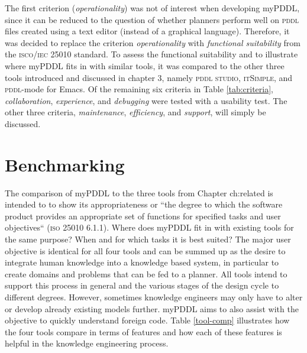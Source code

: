 \documentclass[a4paper,12pt]{report}
\newcommand{\mypddl}{\smallerft[0.8]{myPDDL}\xspace}
\newcommand{\pddlstudio}{\textsc{pddl studio}\xspace}
\newcommand{\itsimple}{\textsc{itSimple}\xspace}
\newcommand{\pddlmode}{\textsc{pddl}-mode\xspace}
\newcommand{\pddl}{\textsc{pddl}\xspace}
\newcommand\smallerft[2][0.85]{{\scalefont{#1}#2}}
\begin{document}
The first criterion (\emph{operationality}) was not of interest when
developing \mypddl, since it can be reduced to the question of whether
planners perform well on \pddl files created using a text editor
(instead of a graphical language). Therefore, it was decided to
replace the criterion \emph{operationality} with \emph{functional suitability}
from the \textsc{isco/iec} 25010 standard. To assess the functional
suitability and to illustrate where \mypddl fits in with similar
tools, it was compared to the other three tools introduced and
discussed in chapter 3, namely \pddlstudio, \itsimple, and \pddlmode
for Emacs. Of the remaining six criteria in Table \ref{tab:criteria},
\emph{collaboration}, \emph{experience}, and \emph{debugging} were tested with a
usability test. The other three criteria, \emph{maintenance}, \emph{efficiency},
and \emph{support}, will simply be discussed.


\section{Benchmarking}
\label{sec-5-1}

The comparison of \mypddl to the three tools from Chapter ch:related
is intended to to show its appropriateness or “the degree to which the
software product provides an appropriate set of functions for
specified tasks and user objectives“ (\textsc{iso} 25010 6.1.1). Where
does \mypddl fit in with existing tools for the same purpose? When and
for which tasks it is best suited? The major user objective is
identical for all four tools and can be summed up as the desire to
integrate human knowledge into a knowledge based system, in particular
to create domains and problems that can be fed to a planner. All tools
intend to support this process in general and the various stages of
the design cycle to different degrees. However, sometimes knowledge
engineers may only have to alter or develop already existing models
further. \mypddl aims to also assist with the objective to quickly
understand foreign code. Table \ref{tool-comp} illustrates how the four
tools compare in terms of features and how each of these features is
helpful in the knowledge engineering process.
\end{document}

